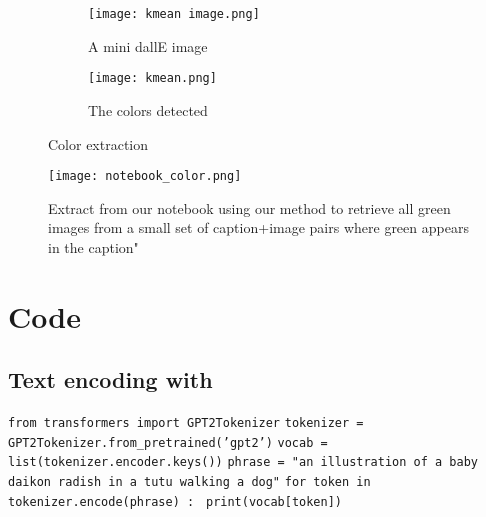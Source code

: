 \documentclass{article}
\begin{document}
\begin{appendix}
\begin{figure}[H]
\begin{subfigure}{.5\textwidth}
  \centering
  \texttt{[image: kmean image.png]}
  \caption{A mini dallE image}
  \label{fig:sfig_kmean_image}
\end{subfigure}%
\begin{subfigure}{.5\textwidth}
  \centering
  \texttt{[image: kmean.png]}
  \caption{The colors detected}
  \label{fig:sfig_kmean}
\end{subfigure}
\caption{Color extraction}
\label{fig:kmean}
\end{figure}

\begin{figure}[H]
    \centering
    \texttt{[image: notebook\_color.png]}
    \caption{Extract from our notebook using our method to retrieve all green images from a small set of caption+image pairs where green appears in the caption"}
    \label{fig:nb_color}
\end{figure}

\section{Code}

\subsection{Text encoding with } \label{textencoding}

\texttt{from transformers import GPT2Tokenizer} \newline
\texttt{tokenizer = GPT2Tokenizer.from_pretrained('gpt2')} \newline
\texttt{vocab     = list(tokenizer.encoder.keys())} \newline 
\texttt{phrase    = "an illustration of a baby daikon radish in a tutu walking a dog"} \newline 
\texttt{for token in tokenizer.encode(phrase) :} \newline 
\texttt{    print(vocab[token])} \newline

\end{appendix}
\end{document}
